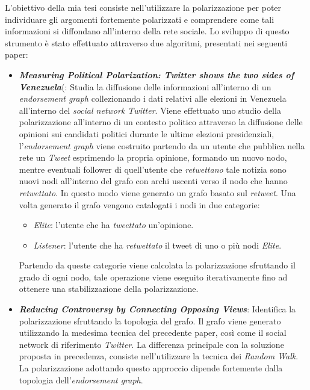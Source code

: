L'obiettivo della mia tesi consiste nell'utilizzare la polarizzazione per poter individuare gli argomenti fortemente polarizzati e comprendere come tali informazioni si diffondano all'interno della rete sociale.
Lo sviluppo di questo strumento è stato effettuato attraverso due algoritmi, presentati nei seguenti paper:
\begin{itemize}
\item \textbf{\textit{Measuring Political Polarization: Twitter shows the two sides of Venezuela}}(\cite{test}:
Studia la diffusione delle informazioni all'interno di un \textit{endorsement graph} collezionando i dati relativi alle elezioni in Venezuela all'interno del \textit{social network Twitter}. Viene effettuato uno studio della polarizzazione all'interno di un contesto politico attraverso la diffusione delle opinioni sui candidati politici durante le ultime elezioni presidenziali, l'\textit{endorsement graph} viene costruito partendo da un utente che pubblica nella rete un \textit{Tweet} esprimendo la propria opinione, formando un nuovo nodo, mentre eventuali follower di quell'utente che \textit{retwettano} tale notizia sono nuovi nodi all'interno del grafo con archi uscenti verso il nodo che hanno \textit{retwettato}. In questo modo viene generato un grafo basato sul \textit{retweet}.
Una volta generato il grafo vengono catalogati i nodi in due categorie:
\begin{itemize}
\item \textit{Elite}: l'utente che ha \textit{tweettato} un'opinione.
\item \textit{Listener}: l'utente che ha \textit{retwettato} il tweet di uno o più nodi \textit{Elite}.
\end{itemize}
Partendo da queste categorie viene calcolata la polarizzazione sfruttando il grado di ogni nodo, tale operazione viene eseguito iterativamente fino ad ottenere una stabilizzazione della polarizzazione.

\item \textbf{\textit{Reducing Controversy by Connecting Opposing Views}}:
Identifica la polarizzazione sfruttando la topologia del grafo. Il grafo viene generato utilizzando la medesima tecnica del precedente paper, così come il social network di riferimento \textit{Twitter}. %
La differenza principale con la soluzione proposta in precedenza, consiste nell'utilizzare la tecnica dei \textit{Random Walk}. La polarizzazione adottando questo approccio dipende fortemente dalla topologia dell'\textit{endorsement graph}. 
\end{itemize}

